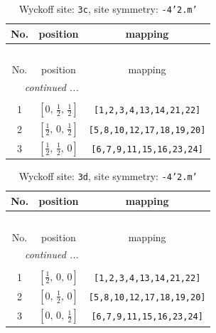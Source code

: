 \documentclass[fleqn,8pt]{jsarticle}
\begin{document}
\begin{longtable}{ccc}
\caption{Wyckoff site: {\tt 3c}, site symmetry: {\tt -4'2.m'}}
 \\
 \hline \hline
No. & position & mapping \\ \hline \endfirsthead

\multicolumn{2}{l}{\tablename\ \thetable{}} \\
 \hline \hline
No. & position & mapping \\ \hline \endhead

 \hline \hline
\multicolumn{2}{r}{\footnotesize\it continued ...} \\ \endfoot

 \hline \hline
\multicolumn{2}{r}{} \\ \endlastfoot

1 & $\left[ 0,\, \frac{1}{2},\, \frac{1}{2} \right]$ & {\tt [1,2,3,4,13,14,21,22]} \\ \hline
2 & $\left[ \frac{1}{2},\, 0,\, \frac{1}{2} \right]$ & {\tt [5,8,10,12,17,18,19,20]} \\ \hline
3 & $\left[ \frac{1}{2},\, \frac{1}{2},\, 0 \right]$ & {\tt [6,7,9,11,15,16,23,24]} \\
\end{longtable}
\renewcommand{\arraystretch}{1.2}
\begin{longtable}{ccc}
\caption{Wyckoff site: {\tt 3d}, site symmetry: {\tt -4'2.m'}}
 \\
 \hline \hline
No. & position & mapping \\ \hline \endfirsthead

\multicolumn{2}{l}{\tablename\ \thetable{}} \\
 \hline \hline
No. & position & mapping \\ \hline \endhead

 \hline \hline
\multicolumn{2}{r}{\footnotesize\it continued ...} \\ \endfoot

 \hline \hline
\multicolumn{2}{r}{} \\ \endlastfoot

1 & $\left[ \frac{1}{2},\, 0,\, 0 \right]$ & {\tt [1,2,3,4,13,14,21,22]} \\ \hline
2 & $\left[ 0,\, \frac{1}{2},\, 0 \right]$ & {\tt [5,8,10,12,17,18,19,20]} \\ \hline
3 & $\left[ 0,\, 0,\, \frac{1}{2} \right]$ & {\tt [6,7,9,11,15,16,23,24]} \\
\end{longtable}
\renewcommand{\arraystretch}{1.2}
\end{document}
